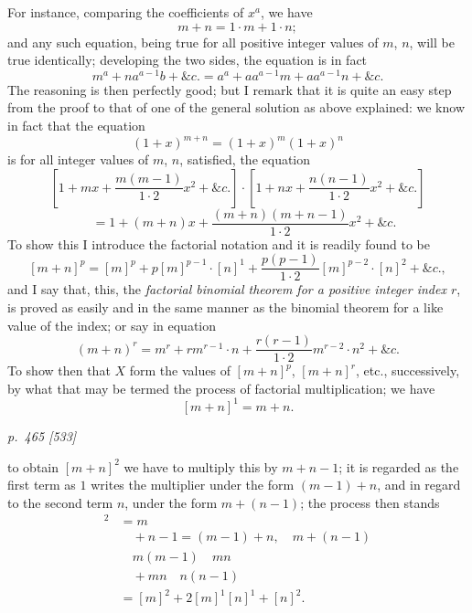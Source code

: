 \documentclass[11pt,a4paper]{book}
\begin{document}
For instance, comparing the coefficients of $x^a$, we have
\[
m + n = 1 \cdot m + 1 \cdot n;
\]
and any such equation, being true for all positive integer values of $m$, $n$, will be
true identically; developing the two sides, the equation is in fact
\[
m^a + na^{a-1}b + \&c. = a^a + a a^{a-1}m + a a^{a-1}n + \&c.
\]
The reasoning is then perfectly good; but I remark that it is quite an easy step from
the proof to that of one of the general solution as above explained: we know in fact
that the equation
\[
(1 + x)^{m+n} = (1 + x)^m (1 + x)^n
\]
is for all integer values of $m$, $n$, satisfied, the equation
\[
\left[1 + mx + \frac{m(m-1)}{1\cdot 2}x^2 + \&c.\right]\cdot\left[1 + nx + \frac{n(n-1)}{1\cdot 2}x^2 + \&c.\right]
\]
\[
\quad = 1 + (m + n)x + \frac{(m + n)(m + n - 1)}{1\cdot 2}x^2 + \&c.
\]
To show this I introduce the factorial notation and it is readily found to
be
\[
[m + n]^p = [m]^p + p[m]^{p-1}\cdot[n]^1 + \frac{p(p-1)}{1\cdot 2}[m]^{p-2}\cdot[n]^2 + \&c.,
\]
and I say that, this, the \textit{factorial binomial theorem for a positive integer index $r$},
is proved as easily and in the same manner as the binomial theorem for a like value
of the index; or say in equation
\[
(m + n)^r = m^r + rm^{r-1}\cdot n + \frac{r(r-1)}{1\cdot 2}m^{r-2}\cdot n^2 + \&c.
\]
To show then that $X$ form the values of $[m + n]^p$, $[m + n]^r$, etc., successively, by what
that may be termed the process of factorial multiplication; we have
\[
[m + n]^1 = m + n.
\]

\clearpage

\bigskip
\textit{p.~465 [533]}
\smallskip

\noindent
to obtain $[m + n]^2$ we have to multiply this by $m + n - 1$; it is regarded as the first term
as $1$ writes the multiplier under the form $(m - 1) + n$, and in regard to the second
term $n$, under the form $m + (n - 1)$; the process then stands
\begin{align*}
[m + n]^2 &= m \\
&\quad + n - 1 = (m - 1) + n,\quad m + (n - 1) \\
&\quad m(m - 1) \quad m n \\
&\quad + mn \quad n(n - 1) \\
&= [m]^2 + 2[m]^1[n]^1 + [n]^2.
\end{align*}
\end{document}
